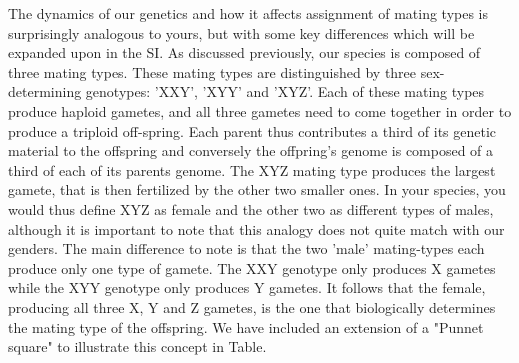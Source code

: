 The dynamics of our genetics and how it affects assignment of mating types is surprisingly analogous to yours, but with some key differences which will be expanded upon in the SI. As discussed previously, our species is composed of three mating types. These mating types are distinguished by three sex-determining genotypes: 'XXY', 'XYY' and 'XYZ'. Each of these mating types produce haploid gametes, and all three gametes need to come together in order to produce a triploid off-spring. Each parent thus contributes a third of its genetic material to the offspring and conversely the offpring's genome is composed of a third of each of its parents genome. The XYZ mating type produces the largest gamete, that is then fertilized by the other two smaller ones. In your species, you would thus define XYZ as female and the other two as different types of males, although it is important to note that this analogy does not quite match with our genders. The main difference to note is that the two 'male' mating-types each produce only one type of gamete. The XXY genotype only produces X gametes while the XYY genotype only produces Y gametes. It follows that the female, producing all three X, Y and Z gametes, is the one that biologically determines the mating type of the offspring. We have included an extension of a "Punnet square" to illustrate this concept in Table. 